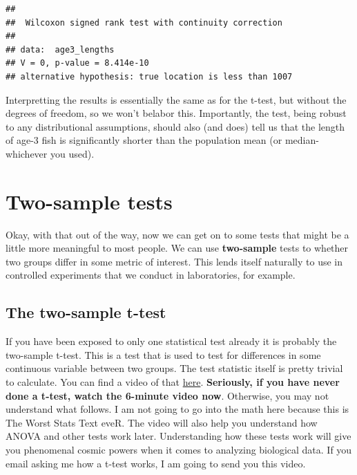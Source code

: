\documentclass[
]{book}
\begin{document}
\begin{verbatim}
## 
## 	Wilcoxon signed rank test with continuity correction
## 
## data:  age3_lengths
## V = 0, p-value = 8.414e-10
## alternative hypothesis: true location is less than 1007
\end{verbatim}

Interpretting the results is essentially the same as for the t-test, but without the degrees of freedom, so we won't belabor this. Importantly, the test, being robust to any distributional assumptions, should also (and does) tell us that the length of age-3 fish is significantly shorter than the population mean (or median- whichever you used).

\hypertarget{two-sample-tests}{%
\section{Two-sample tests}\label{two-sample-tests}}

Okay, with that out of the way, now we can get on to some tests that might be a little more meaningful to most people. We can use \textbf{two-sample} tests to whether two groups differ in some metric of interest. This lends itself naturally to use in controlled experiments that we conduct in laboratories, for example.

\hypertarget{the-two-sample-t-test}{%
\subsection{The two-sample t-test}\label{the-two-sample-t-test}}

If you have been exposed to only one statistical test already it is probably the two-sample t-test. This is a test that is used to test for differences in some continuous variable between two groups. The test statistic itself is pretty trivial to calculate. You can find a video of that \href{https://www.khanacademy.org/math/ap-statistics/two-sample-inference/two-sample-t-test-means/v/two-sample-t-test-for-difference-of-means}{here}. \textbf{Seriously, if you have never done a t-test, watch the 6-minute video now}. Otherwise, you may not understand what follows. I am not going to go into the math here because this is The Worst Stats Text eveR. The video will also help you understand how ANOVA and other tests work later. Understanding how these tests work will give you phenomenal cosmic powers when it comes to analyzing biological data. If you email asking me how a t-test works, I am going to send you this video.
\end{document}
